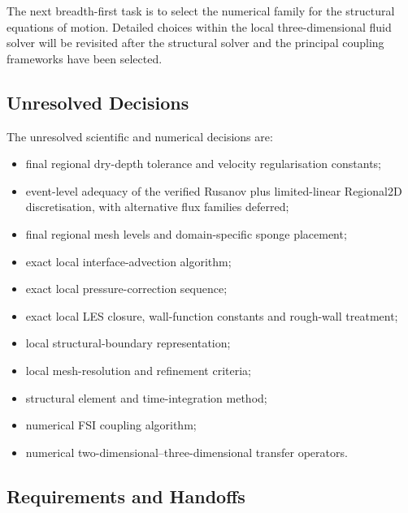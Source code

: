 The next breadth-first task is to select the numerical family for the
structural equations of motion. Detailed choices within the local
three-dimensional fluid solver will be revisited after the structural
solver and the principal coupling frameworks have been selected.

\subsection{Unresolved Decisions}
\label{sec:res-num-spec-unresolved-decisions}


The unresolved scientific and numerical decisions are:

\begin{itemize}
  \item final regional dry-depth tolerance and velocity regularisation
    constants;
  \item event-level adequacy of the verified Rusanov plus limited-linear
    Regional2D discretisation, with alternative flux families deferred;
  \item final regional mesh levels and domain-specific sponge placement;
  \item exact local interface-advection algorithm;
  \item exact local pressure-correction sequence;
  \item exact local LES closure, wall-function constants and rough-wall
    treatment;
  \item local structural-boundary representation;
  \item local mesh-resolution and refinement criteria;
  \item structural element and time-integration method;
  \item numerical FSI coupling algorithm;
  \item numerical two-dimensional--three-dimensional transfer operators.
\end{itemize}

\subsection{Requirements and Handoffs}
\label{sec:res-num-spec-requirements}


